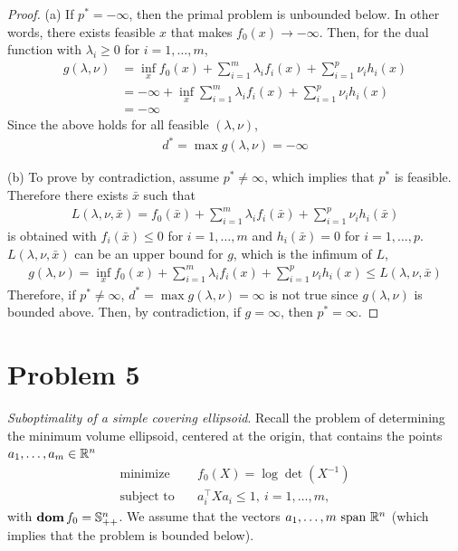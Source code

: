 \documentclass[11pt]{article}
\newcommand{\T}{^\top}
\begin{document}
\begin{proof}
  (a) 
  If $p^* = -\infty$, then the primal problem is unbounded below. In other words, there exists feasible $x$ that makes $f_0(x) \to -\infty$. Then, for the dual function with $\lambda_i \geq 0$ for $i = 1, \ldots, m$, 
  \begin{align*}
      g(\lambda, \nu) 
      &= \inf_x f_0(x) + \sum_{i=1}^m \lambda_i f_i(x) + \sum_{i=1}^p \nu_i h_i(x) \\
      &= -\infty + \inf_x\sum_{i=1}^m \lambda_i f_i(x) + \sum_{i=1}^p \nu_i h_i(x) \\
      &= -\infty
  \end{align*}
  Since the above holds for all feasible $(\lambda, \nu)$, 
  \begin{align*}
      d^* = \max g(\lambda, \nu) = - \infty
  \end{align*}
  
  (b)
  To prove by contradiction, assume $p^* \neq \infty$, which implies that $p^*$ is feasible. Therefore there exists $\bar{x}$ such that
  \begin{align*}
      L(\lambda, \nu, \bar{x}) = f_0(\bar{x}) + \sum_{i=1}^m \lambda_i f_i(\bar{x}) + \sum_{i=1}^p \nu_i h_i(\bar{x})
  \end{align*}
    is obtained with $f_i(\bar{x}) \leq 0$ for $i = 1, \ldots, m$ and $h_i(\bar{x}) = 0$ for $i = 1, \ldots, p$. $L(\lambda, \nu, \bar{x})$ can be an upper bound for $g$, which is the infimum of $L$, 
  \begin{align*}
      g(\lambda, \nu) 
      = \inf_x f_0(x) + \sum_{i=1}^m \lambda_i f_i(x) + \sum_{i=1}^p \nu_i h_i(x) 
      \leq L(\lambda, \nu, \bar{x})
  \end{align*}
  Therefore, if $p^* \neq \infty$, $d^* = \max g(\lambda, \nu) = \infty$ is not true since $g(\lambda, \nu)$ is bounded above. Then, by contradiction, if $g=\infty$, then $p^* = \infty$.
\end{proof}

\clearpage
\section*{Problem 5}
\textit{Suboptimality of a simple covering ellipsoid}. 
Recall the problem of determining the minimum
volume ellipsoid, centered at the origin, that contains the points $a_1, \dots, a_m\in{{\mathbb{R}}}^n$
\begin{align*}
  \text{minimize}\quad& f_0(X) = \log\det(X^{-1})\\
  \text{subject to}\quad & a_i\T X a_i \leq 1, \ i=1,\dots, m,
\end{align*}
with $\mathop{\textbf{dom}} f_0 = {{\mathbb{S}}}^n_{++}$.
We assume that the vectors $a_1, \dots, m \text{ span } {{\mathbb{R}}}^n$ (which implies that the problem is bounded below).
\end{document}
